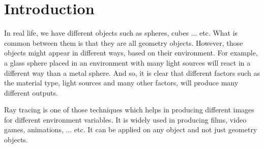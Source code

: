 \documentclass{article}
\begin{document}
	\section{Introduction}
	 In real life, we have different objects such as spheres, cubes ... etc. What is common between them is that they are all geometry objects. However, those objects might appear in different ways, based on their environment. For example, a glass sphere placed in an environment with many light sources will react in a different way than a metal sphere. And so, it is clear that different factors such as the material type, light sources and many other factors, will produce many different outputs. \\
	 \par Ray tracing is one of those techniques which helps in producing different images for different environment variables. It is widely used in producing films, video games, animations, ... etc. It can be applied on any object and not just geometry objects.
\end{document}
